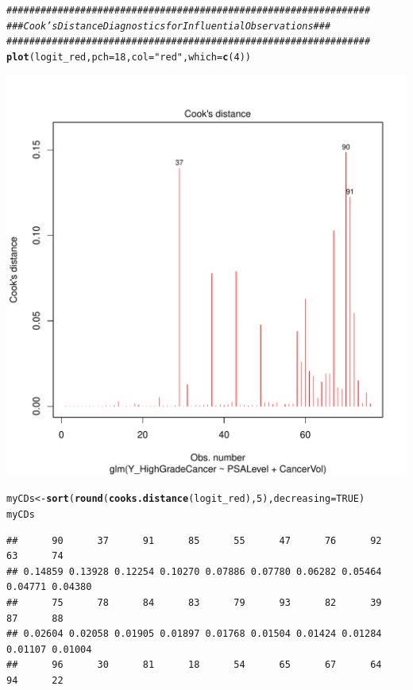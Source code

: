 \documentclass{article}\usepackage[]{graphicx}\usepackage[]{color}
\makeatletter
\def\maxwidth{ %
  \ifdim\Gin@nat@width>\linewidth
    \linewidth
  \else
    \Gin@nat@width
  \fi
}
\newcommand{\hlnum}[1]{\textcolor[rgb]{0.686,0.059,0.569}{#1}}%
\newcommand{\hlstr}[1]{\textcolor[rgb]{0.192,0.494,0.8}{#1}}%
\newcommand{\hlcom}[1]{\textcolor[rgb]{0.678,0.584,0.686}{\textit{#1}}}%
\newcommand{\hlstd}[1]{\textcolor[rgb]{0.345,0.345,0.345}{#1}}%
\newcommand{\hlkwb}[1]{\textcolor[rgb]{0.69,0.353,0.396}{#1}}%
\newcommand{\hlkwc}[1]{\textcolor[rgb]{0.333,0.667,0.333}{#1}}%
\newcommand{\hlkwd}[1]{\textcolor[rgb]{0.737,0.353,0.396}{\textbf{#1}}}%
\newenvironment{kframe}{%
 \def\at@end@of@kframe{}%
 \ifinner\ifhmode%
  \def\at@end@of@kframe{\end{minipage}}%
  \begin{minipage}{\columnwidth}%
 \fi\fi%
 \def\FrameCommand##1{\hskip\@totalleftmargin \hskip-\fboxsep
 \colorbox{shadecolor}{##1}\hskip-\fboxsep
     \hskip-\linewidth \hskip-\@totalleftmargin \hskip\columnwidth}%
 \MakeFramed {\advance\hsize-\width
   \@totalleftmargin\z@ \linewidth\hsize
   \@setminipage}}%
 {\par\unskip\endMakeFramed%
 \at@end@of@kframe}
\newenvironment{knitrout}{}{} %
\makeatother
\begin{document}
\begin{knitrout}
\begin{kframe}
\begin{alltt}
\hlcom{################################################################}
\hlcom{### Cook's Distance Diagnostics for Influential Observations ###}
\hlcom{################################################################}
\hlkwd{plot}\hlstd{(logit_red,} \hlkwc{pch}\hlstd{=}\hlnum{18}\hlstd{,} \hlkwc{col}\hlstd{=}\hlstr{"red"}\hlstd{,} \hlkwc{which}\hlstd{=}\hlkwd{c}\hlstd{(}\hlnum{4}\hlstd{))}
\end{alltt}
\end{kframe}
\includegraphics[width=\maxwidth]{figure/unnamed-chunk-1-1} 
\begin{kframe}\begin{alltt}
\hlstd{myCDs} \hlkwb{<-} \hlkwd{sort}\hlstd{(}\hlkwd{round}\hlstd{(}\hlkwd{cooks.distance}\hlstd{(logit_red),} \hlnum{5}\hlstd{),} \hlkwc{decreasing}\hlstd{=}\hlnum{TRUE}\hlstd{)}
\hlstd{myCDs}
\end{alltt}
\begin{verbatim}
##      90      37      91      85      55      47      76      92      63      74 
## 0.14859 0.13928 0.12254 0.10270 0.07886 0.07780 0.06282 0.05464 0.04771 0.04380 
##      75      78      84      83      79      93      82      39      87      88 
## 0.02604 0.02058 0.01905 0.01897 0.01768 0.01504 0.01424 0.01284 0.01107 0.01004 
##      96      30      81      18      54      65      67      64      94      22 

\end{verbatim}
\end{kframe}
\end{knitrout}
\end{document}
